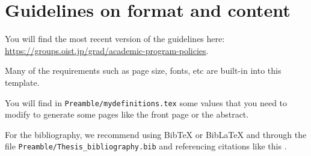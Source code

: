 
\chapter{Guidelines on format and content} \label{ch-1}

You will find the most recent version of the guidelines here: \url{https://groups.oist.jp/grad/academic-program-policies}.

Many of the requirements such as page size, fonts, etc are built-in into this template.

You will find in \texttt{Preamble/mydefinitions.tex} some values that you need to modify to generate some pages like the front page or the abstract.

For the bibliography, we recommend using BibTeX or BibLaTeX and through the file \texttt{Preamble/Thesis\_bibliography.bib} and referencing citations like this \cite{Lee98, Muc10, Kra27}. 
